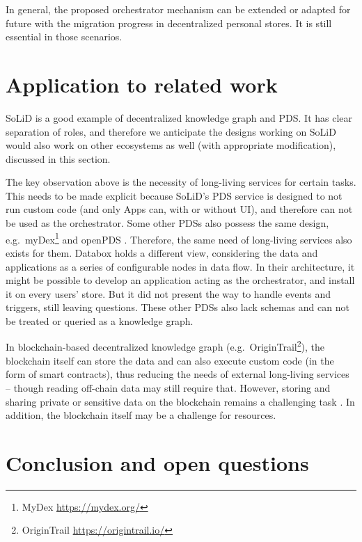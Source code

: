 \documentclass[
twocolumn,
]{ceurart}
\begin{document}
In general, the proposed orchestrator mechanism can be extended or adapted for future with the migration progress in decentralized personal stores. It is still essential in those scenarios.

\section{Application to related work}

SoLiD is a good example of decentralized knowledge graph and PDS. It has clear separation of roles, and therefore we anticipate the designs working on SoLiD would also work on other ecosystems as well (with appropriate modification), discussed in this section.

The key observation above is the necessity of long-living services for certain tasks. This needs to be made explicit because SoLiD's PDS service is designed to not run custom code (and only Apps can, with or without UI), and therefore can not be used as the orchestrator.
Some other PDSs also possess the same design, e.g.~myDex\footnote{MyDex \url{https://mydex.org/}} and openPDS \cite{de_montjoye_openpds_2014}. Therefore, the same need of long-living services also exists for them.
Databox \cite{mortier_personal_2016} holds a different view, considering the data and applications as a series of configurable nodes in data flow. In their architecture, it might be possible to develop an application acting as the orchestrator, and install it on every users' store. But it did not present the way to handle events and triggers, still leaving questions.
These other PDSs also lack schemas and can not be treated or queried as a knowledge graph.

In blockchain-based decentralized knowledge graph (e.g.~OriginTrail\footnote{OriginTrail \url{https://origintrail.io/}}), the blockchain itself can store the data and can also execute custom code (in the form of smart contracts), thus reducing the needs of external long-living services -- though reading off-chain data may still require that. However, storing and sharing private or sensitive data on the blockchain remains a challenging task \cite{bernal_bernabe_privacy-preserving_2019}. In addition, the blockchain itself may be a challenge for resources.

\section{Conclusion and open questions}
\end{document}
